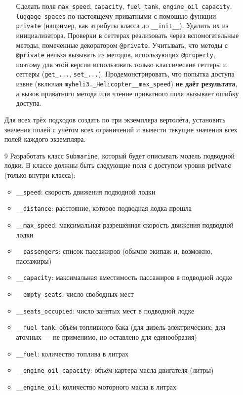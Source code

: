 \begin{enumerate}
\begin{enumerate}
    Сделать поля \texttt{max\_speed}, \texttt{capacity}, \texttt{fuel\_tank}, \texttt{engine\_oil\_capacity}, \texttt{luggage\_spaces} по-настоящему приватными с помощью функции \texttt{private} (например, как атрибуты класса до \texttt{\_\_init\_\_}). Удалить их из инициализатора.  
    Проверки в сеттерах реализовать через вспомогательные методы, помеченные декоратором \texttt{@private}.  
    Учитывать, что методы с \texttt{@private} нельзя вызывать из методов, использующих \texttt{@property}, поэтому для этой версии использовать только классические геттеры и сеттеры (\texttt{get\_...}, \texttt{set\_...}).  
    Продемонстрировать, что попытка доступа извне (включая \texttt{myheli3.\_Helicopter\_\_max\_speed}) \textbf{не даёт результата}, а вызов приватного метода или чтение приватного поля вызывает ошибку доступа.
\end{enumerate}
Для всех трёх подходов создать по три экземпляра вертолёта, установить значения полей с учётом всех ограничений и вывести текущие значения всех полей каждого экземпляра.
\item[9] Разработать класс \texttt{Submarine}, который будет описывать модель подводной лодки. В классе должны быть следующие поля с доступом уровня \textbf{private} (только внутри класса):
\begin{itemize}
    \item \texttt{\_\_speed}: скорость движения подводной лодки  
    \item \texttt{\_\_distance}: расстояние, которое подводная лодка прошла  
    \item \texttt{\_\_max\_speed}: максимальная разрешённая скорость движения подводной лодки  
    \item \texttt{\_\_passengers}: список пассажиров (обычно экипаж и, возможно, пассажиры)  
    \item \texttt{\_\_capacity}: максимальная вместимость пассажиров в подводной лодке  
    \item \texttt{\_\_empty\_seats}: число свободных мест  
    \item \texttt{\_\_seats\_occupied}: число занятых мест в подводной лодке  
    \item \texttt{\_\_fuel\_tank}: объём топливного бака (для дизель-электрических; для атомных — не применимо, но оставлено для единообразия)  
    \item \texttt{\_\_fuel}: количество топлива в литрах  
    \item \texttt{\_\_engine\_oil\_capacity}: объём картера масла двигателя (литры)  
    \item \texttt{\_\_engine\_oil}: количество моторного масла в литрах  

\end{itemize}
\end{enumerate}
